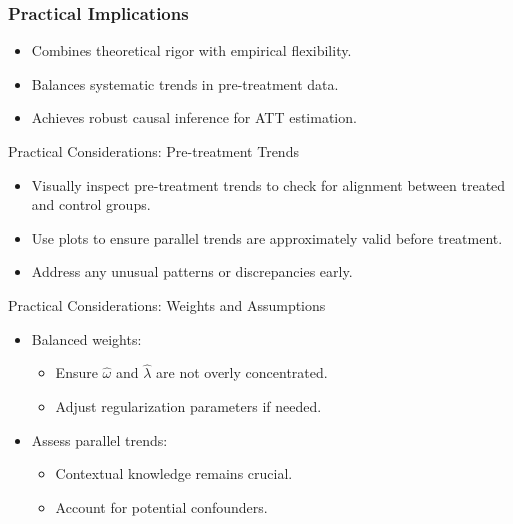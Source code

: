 \documentclass{beamer}
\begin{document}
\begin{frame}
\frametitle{Practical Implications}

\begin{itemize}
    \item Combines theoretical rigor with empirical flexibility.
    \item Balances systematic trends in pre-treatment data.
    \item Achieves robust causal inference for ATT estimation.
\end{itemize}

\end{frame}



\begin{frame}{Practical Considerations: Pre-treatment Trends}

\begin{itemize}
    \item Visually inspect pre-treatment trends to check for alignment between treated and control groups.
    \item Use plots to ensure parallel trends are approximately valid before treatment.
    \item Address any unusual patterns or discrepancies early.
\end{itemize}

\end{frame}


\begin{frame}{Practical Considerations: Weights and Assumptions}

\begin{itemize}
    \item Balanced weights:
    \begin{itemize}
        \item Ensure $\hat{\omega}$ and $\hat{\lambda}$ are not overly concentrated.
        \item Adjust regularization parameters if needed.
    \end{itemize}
    \item Assess parallel trends:
    \begin{itemize}
        \item Contextual knowledge remains crucial.
        \item Account for potential confounders.
    \end{itemize}
\end{itemize}

\end{frame}
\end{document}

